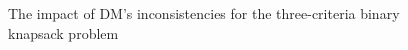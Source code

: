 \begin{figure}
  \centering
  \caption{The impact of DM's inconsistencies for the three-criteria binary
    knapsack problem}
  \label{c3_noise}
\end{figure}

